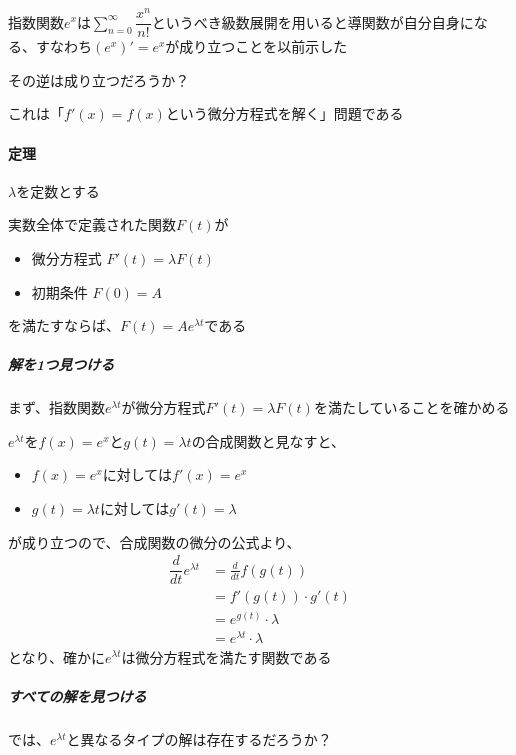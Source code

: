 \documentclass[../book_jiriki_calc]{subfiles}
\begin{document}
指数関数$e^x$は$\displaystyle\sum_{n=0}^{\infty}\dfrac{x^n}{n!}$というべき級数展開を用いると導関数が自分自身になる、すなわち$(e^x)'=e^x$が成り立つことを以前示した

\br

その逆は成り立つだろうか？

これは「$f'(x)=f(x)$という微分方程式を解く」問題である

\sectionline

\paragraph{定理}

$\lambda$を定数とする

実数全体で定義された関数$F(t)$が
\begin{itemize}
  \item 微分方程式 $F'(t) = \lambda F(t)$
  \item 初期条件 $F(0) = A$
\end{itemize}
を満たすならば、$F(t) = Ae^{\lambda t}$である

\sectionline

\subparagraph{解を1つ見つける}\quad

まず、指数関数$e^{\lambda t}$が微分方程式$F'(t)=\lambda F(t)$を満たしていることを確かめる

\br

$e^{\lambda t}$を$f(x)=e^x$と$g(t)=\lambda t$の合成関数と見なすと、
\begin{itemize}
  \item $f(x)=e^x$に対しては$f'(x)=e^x$
  \item $g(t)=\lambda t$に対しては$g'(t)=\lambda$
\end{itemize}
が成り立つので、合成関数の微分の公式より、
\begin{align}
  \dfrac{d}{dt}e^{\lambda t} & = \frac{d}{dt} f(g(t))        \\
                             & = f'(g(t)) \cdot g'(t)        \\
                             & = e^{g(t)} \cdot \lambda      \\
                             & = e^{\lambda t} \cdot \lambda
\end{align}
となり、確かに$e^{\lambda t}$は微分方程式を満たす関数である

\sectionline

\subparagraph{すべての解を見つける}\quad

では、$e^{\lambda t}$と異なるタイプの解は存在するだろうか？
\end{document}
